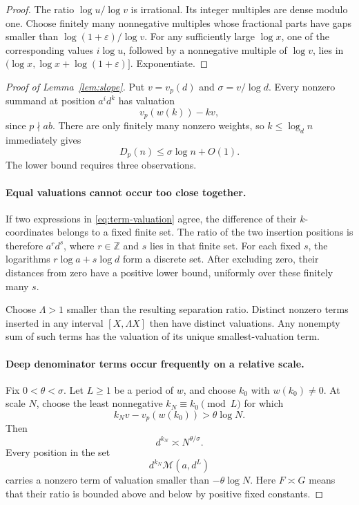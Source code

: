 \documentclass[11pt]{article}
\newcommand{\M}{\mathcal M}
\begin{document}
\begin{proof}
The ratio \(\log u/\log v\) is irrational. Its integer multiples
are dense modulo one. Choose finitely many nonnegative multiples whose
fractional parts have gaps smaller than
\(\log(1+\varepsilon)/\log v\). For any sufficiently large
\(\log x\), one of the corresponding values \(i\log u\), followed
by a nonnegative multiple of \(\log v\), lies in
\((\log x,\log x+\log(1+\varepsilon)]\). Exponentiate.
\end{proof}

\begin{proof}[Proof of Lemma~\ref{lem:slope}]
Put \(v=v_p(d)\) and \(\sigma=v/\log d\). Every nonzero summand
at position \(a^id^k\) has valuation
\begin{equation}\label{eq:term-valuation}
 v_p(w(k))-kv,
\end{equation}
since \(p\nmid ab\). There are only finitely many nonzero weights,
so \(k\le\log_d n\) immediately gives
\[
 D_p(n)\le\sigma\log n+O(1).
\]
The lower bound requires three observations.

\paragraph{Equal valuations cannot occur too close together.}
If two expressions in \eqref{eq:term-valuation} agree, the difference
of their \(k\)-coordinates belongs to a fixed finite set. The ratio
of the two insertion positions is therefore \(a^r d^s\), where
\(r\in\mathbb Z\) and \(s\) lies in that finite set. For each
fixed \(s\), the logarithms \(r\log a+s\log d\) form a discrete
set. After excluding zero, their distances from zero have a positive
lower bound, uniformly over these finitely many \(s\).

Choose \(\Lambda>1\) smaller than the resulting separation ratio.
Distinct nonzero terms inserted in any interval \([X,\Lambda X]\)
then have distinct valuations. Any nonempty sum of such terms has the
valuation of its unique smallest-valuation term.

\paragraph{Deep denominator terms occur frequently on a relative scale.}
Fix \(0<\theta<\sigma\). Let \(L\ge1\) be a period of \(w\),
and choose \(k_0\) with \(w(k_0)\ne0\). At scale \(N\), choose
the least nonnegative \(k_N\equiv k_0\pmod L\) for which
\[
 k_Nv-v_p(w(k_0))>\theta\log N.
\]
Then
\begin{equation}\label{eq:threshold}
 d^{k_N}\asymp N^{\theta/\sigma}.
\end{equation}
Every position in the set
\begin{equation}\label{eq:deep-set}
 d^{k_N}\M(a,d^L)
\end{equation}
carries a nonzero term of valuation smaller than
\(-\theta\log N\). Here \(F\asymp G\) means that their ratio is
bounded above and below by positive fixed constants.


\end{proof}
\end{document}
